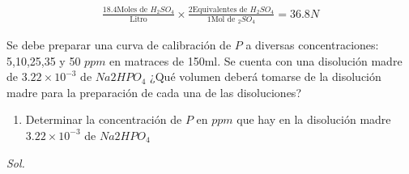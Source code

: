 \begin{align*}
	\frac{18.4 \text{Moles de } {H_2SO_{4}}}{\text{Litro}} \times \frac{2 \text{Equivalentes de } H_{2}SO_{4}}{1 \text{Mol de } _{2}SO_{4}}= 36.8N
\end{align*}

\begin{problem}
Se debe preparar una curva de calibración de $P$ a diversas concentraciones: 5,10,25,35 y 50 $ppm$ en matraces de 150ml. Se cuenta con una disolución madre de $3.22\times 10^{-3}$ de $Na{2}HPO_{4}$ ¿Qué volumen deberá tomarse de la disolución madre para la preparación de cada una de las disoluciones?
\begin{enumerate}
	\item Determinar la concentración de $P$ en $ppm$ que hay en la disolución madre $3.22\times 10^{-3}$ de $Na{2}HPO_{4}$
\end{enumerate}
\end{problem}

\textit{ Sol. }

